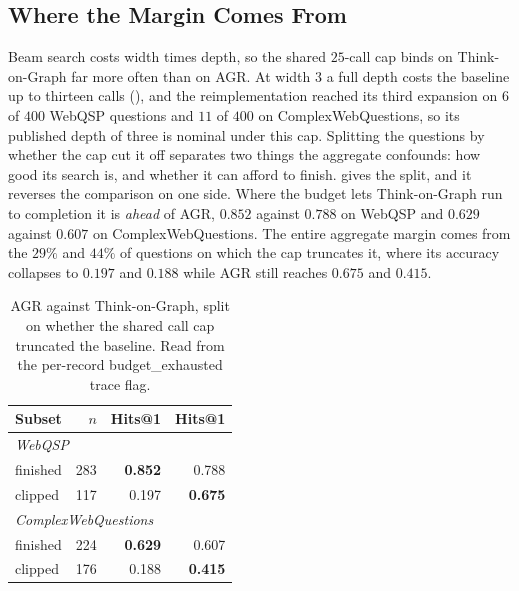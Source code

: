 \subsection{Where the Margin Comes From}\label{sec:margin}

Beam search costs width times depth, so the shared $25$-call cap binds
on Think-on-Graph far more often than on AGR. At width $3$ a full depth
costs the baseline up to thirteen calls (), and the
reimplementation reached its third expansion on $6$ of $400$ WebQSP
questions and $11$ of $400$ on ComplexWebQuestions, so its published
depth of three is nominal under this cap. Splitting the questions by
whether the cap cut it off separates two things the aggregate confounds:
how good its search is, and whether it can afford to finish.
 gives the split, and it reverses the comparison on
one side. Where the budget lets Think-on-Graph run to completion it is
\emph{ahead} of AGR, $0.852$ against $0.788$ on WebQSP and $0.629$
against $0.607$ on ComplexWebQuestions. The entire aggregate margin
comes from the $29\%$ and $44\%$ of questions on which the cap truncates
it, where its accuracy collapses to $0.197$ and $0.188$ while AGR still
reaches $0.675$ and $0.415$.

\begin{table}[!tb]
  \begin{center}
    \caption{AGR against Think-on-Graph, split on whether the shared
      call cap truncated the baseline. Read from the per-record
      \textsf{budget\_exhausted} trace flag.}
    \label{tab:togsplit}
    \footnotesize
    \begin{tabular}{|l|r|rr|}
      \hline
      \textbf{Subset} & \textbf{$n$} & \textbf{\tog{} Hits@1}
        & \textbf{\agr{} Hits@1} \\
      \hline
      \multicolumn{4}{|l|}{\textit{WebQSP}} \\
      \tog{} finished & 283 & \textbf{0.852} & 0.788 \\
      \tog{} clipped  & 117 & 0.197 & \textbf{0.675} \\
      \hline
      \multicolumn{4}{|l|}{\textit{ComplexWebQuestions}} \\
      \tog{} finished & 224 & \textbf{0.629} & 0.607 \\
      \tog{} clipped  & 176 & 0.188 & \textbf{0.415} \\
      \hline
    \end{tabular}
  \end{center}
\end{table}

